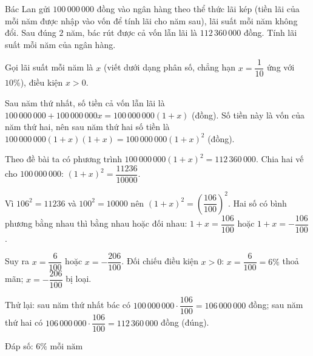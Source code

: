\begin{problem}[9DS-PT2-012]
Bác Lan gửi $100\,000\,000$ đồng vào ngân hàng theo thể thức lãi kép (tiền lãi của mỗi năm được nhập vào vốn để tính lãi cho năm sau), lãi suất mỗi năm không đổi. Sau đúng $2$ năm, bác rút được cả vốn lẫn lãi là $112\,360\,000$ đồng. Tính lãi suất mỗi năm của ngân hàng.

\begin{solution}
Gọi lãi suất mỗi năm là $x$ (viết dưới dạng phân số, chẳng hạn $x = \dfrac{1}{10}$ ứng với $10\%$), điều kiện $x > 0$.

Sau năm thứ nhất, số tiền cả vốn lẫn lãi là $100\,000\,000 + 100\,000\,000x = 100\,000\,000(1 + x)$ (đồng). Số tiền này là vốn của năm thứ hai, nên sau năm thứ hai số tiền là $100\,000\,000(1 + x)(1 + x) = 100\,000\,000(1 + x)^2$ (đồng).

Theo đề bài ta có phương trình $100\,000\,000(1 + x)^2 = 112\,360\,000$. Chia hai vế cho $100\,000\,000$: $(1 + x)^2 = \dfrac{11236}{10000}$.

Vì $106^2 = 11236$ và $100^2 = 10000$ nên $(1 + x)^2 = \left(\dfrac{106}{100}\right)^2$. Hai số có bình phương bằng nhau thì bằng nhau hoặc đối nhau: $1 + x = \dfrac{106}{100}$ hoặc $1 + x = -\dfrac{106}{100}$.

Suy ra $x = \dfrac{6}{100}$ hoặc $x = -\dfrac{206}{100}$. Đối chiếu điều kiện $x > 0$: $x = \dfrac{6}{100} = 6\%$ thoả mãn; $x = -\dfrac{206}{100}$ bị loại.

Thử lại: sau năm thứ nhất bác có $100\,000\,000 \cdot \dfrac{106}{100} = 106\,000\,000$ đồng; sau năm thứ hai có $106\,000\,000 \cdot \dfrac{106}{100} = 112\,360\,000$ đồng (đúng).

Đáp số: $\boxed{6\% \text{ mỗi năm}}$
\end{solution}
\end{problem}

